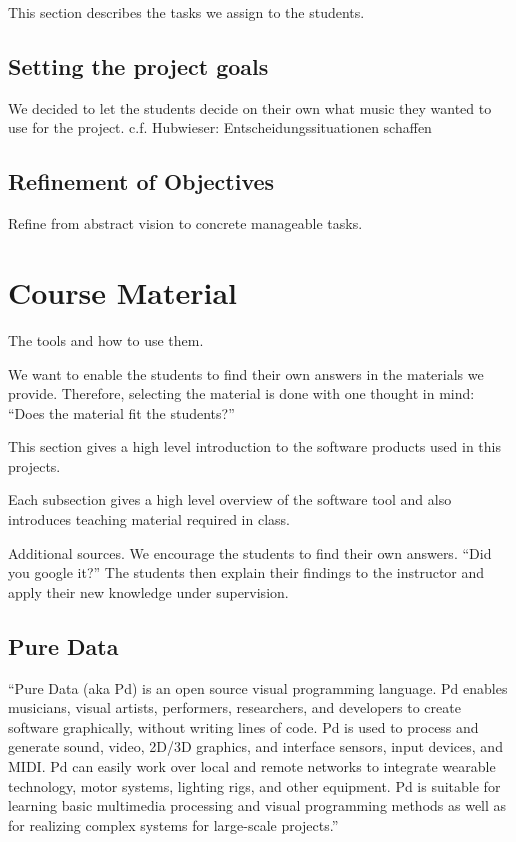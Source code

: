 \documentclass[onecolumn,nocopyrightspace,preprint]{sigplanconf}
\begin{document}
This section describes the tasks we assign to the students.

\subsection{Setting the project goals}

We decided to let the students decide on their own what music they wanted to use for the project.
c.f. Hubwieser: Entscheidungssituationen schaffen


\subsection{Refinement of Objectives}

Refine from abstract vision to concrete manageable tasks.


\section{Course Material}

The tools and how to use them.

We want to enable the students to find their own answers in the materials
we provide. Therefore, selecting the material is done with one thought
in mind: ``Does the material fit the students?''

This section gives a high level introduction to the software products
used in this projects.

Each subsection gives a high level overview of the software tool and
also introduces teaching material required in class.

Additional sources. We encourage the students to find their own answers.
``Did you google it?''
The students then explain their findings to the instructor and apply their
new knowledge under supervision.

\subsection{Pure Data}

``Pure Data (aka Pd) is an open source visual programming language. Pd enables
musicians, visual artists, performers, researchers, and developers to create
software graphically, without writing lines of code. Pd is used to process
and generate sound, video, 2D/3D graphics, and interface sensors, input
devices, and MIDI. Pd can easily work over local and remote networks to
integrate wearable technology, motor systems, lighting rigs, and other
equipment. Pd is suitable for learning basic multimedia processing and
visual programming methods as well as for realizing complex systems for
large-scale projects.''~\cite{website:puredata}
\end{document}

